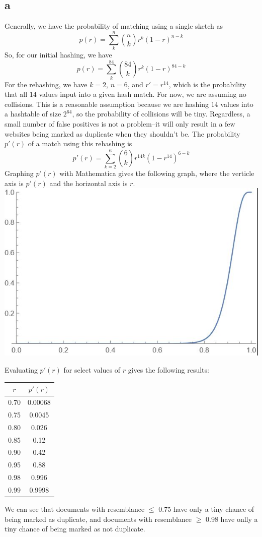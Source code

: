 \documentclass{article}
\begin{document}
\subsection*{a}
Generally, we have the probability of matching using a single sketch as
$$p(r) = \sum\limits_k^n {n \choose k} r^k (1-r)^{n-k}$$
So, for our initial hashing, we have
$$p(r) =  \sum\limits_k^{84} {84 \choose k} r^k (1-r)^{84-k}$$
For the rehashing, we have $k=2$, $n = 6$, and $r' = r^{14}$, which is the probability that all $14$ values input into a given hash match. For now, we are assuming no collisions. This is a reasonable assumption because we are hashing $14$ values into a hashtable of size $2^{64}$, so the probability of collisions will be tiny. Regardless, a small number of false positives is not a problem--it will only result in a few websites being marked as duplicate when they shouldn't be. The probability $p'(r)$ of a match using this rehashing is
$$p'(r) = \sum\limits_{k=2}^6 {6 \choose k} r^{14k} (1-r^{14})^{6-k}$$
Graphing $p'(r)$ with Mathematica gives the following graph, where the verticle axis is $p'(r)$ and the horizontal axis is $r$. \\
\includegraphics[scale=0.7]{pset5_3_graph.jpg}

Evaluating $p'(r)$ for select values of $r$ gives the following results: \\
\begin{center}
\begin{tabular}{ | c | c | }
\hline
$r$ & $p'(r)$ \\
\hline\hline
0.70 & 0.00068 \\
\hline
0.75 & 0.0045\\
\hline
0.80 & 0.026\\
\hline
0.85 & 0.12\\
\hline
0.90 & 0.42\\
\hline
0.95 & 0.88\\
\hline
0.98 & 0.996 \\
\hline
0.99 & 0.9998 \\ 
\hline

\end{tabular}
\end{center}
We can see that documents with resemblance $\leq$ 0.75 have only a tiny chance of being marked as duplicate, and documents with resemblance $\geq$ 0.98 have onlly a tiny chance of being marked as not duplicate.  
\end{document}
